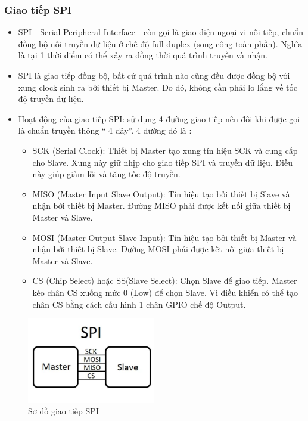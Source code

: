 \subsubsection{Giao tiếp SPI}
\begin{itemize}
    \item SPI - Serial Peripheral Interface - còn gọi là giao diện ngoại vi nối tiếp, chuẩn đồng bộ nối truyền dữ liệu ở chế độ full-duplex (song công toàn phần). Nghĩa là tại 1 thời điểm có thể xảy ra đồng thời quá trình truyền và nhận.
    \item SPI là giao tiếp đồng bộ, bất cứ quá trình nào cũng đều được đồng bộ với xung clock sinh ra bởi thiết bị Master. Do đó, không cần phải lo lắng về tốc độ truyền dữ liệu.
    \item Hoạt động của giao tiếp SPI: sử dụng 4 đường giao tiếp nên đôi khi được gọi là chuẩn truyền thông “ 4 dây”. 4 đường đó là :
    \begin{itemize}
        \item SCK (Serial Clock): Thiết bị Master tạo xung tín hiệu SCK và cung cấp cho Slave. Xung này giữ nhịp cho giao tiếp SPI và truyền dữ liệu. Điều này giúp giảm lỗi và tăng tốc độ truyền.
        \item MISO (Master Input Slave Output): Tín hiệu tạo bởi thiết bị Slave và nhận bởi thiết bị Master. Đường MISO phải được kết nối giữa thiết bị Master và Slave.
        \item MOSI (Master Output Slave Input): Tín hiệu tạo bởi thiết bị Master và nhận bởi thiết bị Slave. Đường MOSI phải được kết nối giữa thiết bị Master và Slave.
        \item CS (Chip Select) hoặc SS(Slave Select): Chọn Slave để giao tiếp. Master kéo chân CS xuống mức 0 (Low) để chọn Slave. Vi điều khiển có thể tạo chân CS bằng cách cấu hình 1 chân GPIO chế độ Output.
    \end{itemize}
\end{itemize}
\begin{figure}[ht]
    \centering
    \includegraphics[width=0.5\textwidth]{graphics/spi.jpg}
    \caption{Sơ đồ giao tiếp SPI}
\end{figure}

